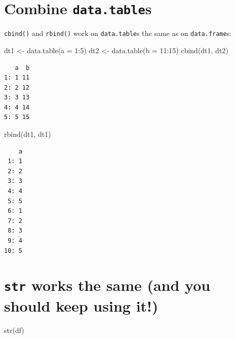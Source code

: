 \documentclass[
]{book}
\newenvironment{Shaded}{\begin{snugshade}}{\end{snugshade}}
\newcommand{\AttributeTok}[1]{\textcolor[rgb]{0.77,0.63,0.00}{#1}}
\newcommand{\DecValTok}[1]{\textcolor[rgb]{0.00,0.00,0.81}{#1}}
\newcommand{\FunctionTok}[1]{\textcolor[rgb]{0.00,0.00,0.00}{#1}}
\newcommand{\NormalTok}[1]{#1}
\newcommand{\OtherTok}[1]{\textcolor[rgb]{0.56,0.35,0.01}{#1}}
\newcommand{\SpecialCharTok}[1]{\textcolor[rgb]{0.00,0.00,0.00}{#1}}
\begin{document}
\hypertarget{combine-data.tables}{%
\section{\texorpdfstring{Combine \texttt{data.table}s}{Combine data.tables}}\label{combine-data.tables}}

\texttt{cbind()} and \texttt{rbind()} work on \texttt{data.table}s the same as on \texttt{data.frame}s:

\begin{Shaded}
\begin{Highlighting}[]
\NormalTok{dt1 }\OtherTok{\textless{}{-}} \FunctionTok{data.table}\NormalTok{(}\AttributeTok{a =} \DecValTok{1}\SpecialCharTok{:}\DecValTok{5}\NormalTok{)}
\NormalTok{dt2 }\OtherTok{\textless{}{-}} \FunctionTok{data.table}\NormalTok{(}\AttributeTok{b =} \DecValTok{11}\SpecialCharTok{:}\DecValTok{15}\NormalTok{)}
\FunctionTok{cbind}\NormalTok{(dt1, dt2)}
\end{Highlighting}
\end{Shaded}

\begin{verbatim}
   a  b
1: 1 11
2: 2 12
3: 3 13
4: 4 14
5: 5 15
\end{verbatim}

\begin{Shaded}
\begin{Highlighting}[]
\FunctionTok{rbind}\NormalTok{(dt1, dt1)}
\end{Highlighting}
\end{Shaded}

\begin{verbatim}
    a
 1: 1
 2: 2
 3: 3
 4: 4
 5: 5
 6: 1
 7: 2
 8: 3
 9: 4
10: 5
\end{verbatim}

\hypertarget{str-works-the-same-and-you-should-keep-using-it}{%
\section{\texorpdfstring{\texttt{str} works the same (and you should keep using it!)}{str works the same (and you should keep using it!)}}\label{str-works-the-same-and-you-should-keep-using-it}}

\begin{Shaded}
\begin{Highlighting}[]
\FunctionTok{str}\NormalTok{(df)}
\end{Highlighting}
\end{Shaded}
\end{document}
